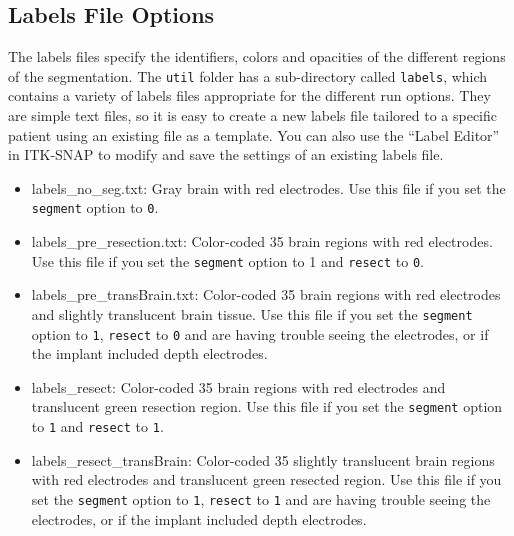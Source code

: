 \documentclass[12pt]{article}
\begin{document}
\subsection{Labels File Options}
\label{sec: labels}
The labels files specify the identifiers, colors and opacities of the different regions of the segmentation. The \texttt{util} folder has a sub-directory called \texttt{labels}, which contains a variety of labels files appropriate for the different run options. They are simple text files, so it is easy to create a new labels file tailored to a specific patient using an existing file as a template. You can also use the ``Label Editor'' in ITK-SNAP to modify and save the settings of an existing labels file.
\begin{itemize}
\item{labels\_no\_seg.txt}: Gray brain with red electrodes. Use this file if you set the \texttt{segment} option to \texttt{0}. 
\item{labels\_pre\_resection.txt}: Color-coded 35 brain regions with red electrodes. Use this file if you set the \texttt{segment} option to 1 and \texttt{resect} to \texttt{0}.
\item{labels\_pre\_transBrain.txt}: Color-coded 35 brain regions with red electrodes and slightly translucent brain tissue. Use this file if you set the \texttt{segment} option to \texttt{1}, \texttt{resect} to \texttt{0} and are having trouble seeing the electrodes, or if the implant included depth electrodes.
\item{labels\_resect}: Color-coded 35 brain regions with red electrodes and translucent green resection region. Use this file if you set the \texttt{segment} option to \texttt{1} and \texttt{resect} to \texttt{1}.
\item{labels\_resect\_transBrain}: Color-coded 35 slightly translucent brain regions with red electrodes and translucent green resected region. Use this file if you set the \texttt{segment} option to \texttt{1}, \texttt{resect} to \texttt{1} and are having trouble seeing the electrodes, or if the implant included depth electrodes.

\end{itemize}
\end{document}
